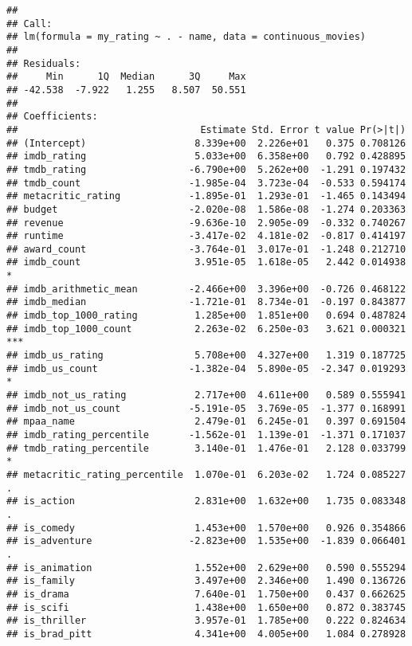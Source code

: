 \documentclass[
]{article}
\begin{document}
\begin{verbatim}
## 
## Call:
## lm(formula = my_rating ~ . - name, data = continuous_movies)
## 
## Residuals:
##     Min      1Q  Median      3Q     Max 
## -42.538  -7.922   1.255   8.507  50.551 
## 
## Coefficients:
##                                Estimate Std. Error t value Pr(>|t|)    
## (Intercept)                   8.339e+00  2.226e+01   0.375 0.708126    
## imdb_rating                   5.033e+00  6.358e+00   0.792 0.428895    
## tmdb_rating                  -6.790e+00  5.262e+00  -1.291 0.197432    
## tmdb_count                   -1.985e-04  3.723e-04  -0.533 0.594174    
## metacritic_rating            -1.895e-01  1.293e-01  -1.465 0.143494    
## budget                       -2.020e-08  1.586e-08  -1.274 0.203363    
## revenue                      -9.636e-10  2.905e-09  -0.332 0.740267    
## runtime                      -3.417e-02  4.181e-02  -0.817 0.414197    
## award_count                  -3.764e-01  3.017e-01  -1.248 0.212710    
## imdb_count                    3.951e-05  1.618e-05   2.442 0.014938 *  
## imdb_arithmetic_mean         -2.466e+00  3.396e+00  -0.726 0.468122    
## imdb_median                  -1.721e-01  8.734e-01  -0.197 0.843877    
## imdb_top_1000_rating          1.285e+00  1.851e+00   0.694 0.487824    
## imdb_top_1000_count           2.263e-02  6.250e-03   3.621 0.000321 ***
## imdb_us_rating                5.708e+00  4.327e+00   1.319 0.187725    
## imdb_us_count                -1.382e-04  5.890e-05  -2.347 0.019293 *  
## imdb_not_us_rating            2.717e+00  4.611e+00   0.589 0.555941    
## imdb_not_us_count            -5.191e-05  3.769e-05  -1.377 0.168991    
## mpaa_name                     2.479e-01  6.245e-01   0.397 0.691504    
## imdb_rating_percentile       -1.562e-01  1.139e-01  -1.371 0.171037    
## tmdb_rating_percentile        3.140e-01  1.476e-01   2.128 0.033799 *  
## metacritic_rating_percentile  1.070e-01  6.203e-02   1.724 0.085227 .  
## is_action                     2.831e+00  1.632e+00   1.735 0.083348 .  
## is_comedy                     1.453e+00  1.570e+00   0.926 0.354866    
## is_adventure                 -2.823e+00  1.535e+00  -1.839 0.066401 .  
## is_animation                  1.552e+00  2.629e+00   0.590 0.555294    
## is_family                     3.497e+00  2.346e+00   1.490 0.136726    
## is_drama                      7.640e-01  1.750e+00   0.437 0.662625    
## is_scifi                      1.438e+00  1.650e+00   0.872 0.383745    
## is_thriller                   3.957e-01  1.785e+00   0.222 0.824634    
## is_brad_pitt                  4.341e+00  4.005e+00   1.084 0.278928    

\end{verbatim}
\end{document}
